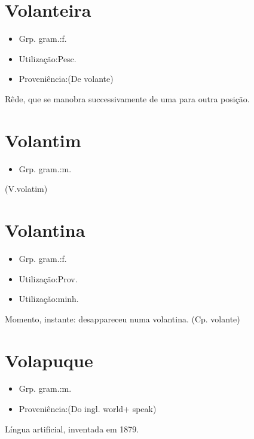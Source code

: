 \documentclass{article}
\begin{document}
\section{Volanteira}
\begin{itemize}
\item {Grp. gram.:f.}
\end{itemize}
\begin{itemize}
\item {Utilização:Pesc.}
\end{itemize}
\begin{itemize}
\item {Proveniência:(De \textunderscore volante\textunderscore )}
\end{itemize}
Rêde, que se manobra successivamente de uma para outra posição.
\section{Volantim}
\begin{itemize}
\item {Grp. gram.:m.}
\end{itemize}
(V.volatim)
\section{Volantina}
\begin{itemize}
\item {Grp. gram.:f.}
\end{itemize}
\begin{itemize}
\item {Utilização:Prov.}
\end{itemize}
\begin{itemize}
\item {Utilização:minh.}
\end{itemize}
Momento, instante: \textunderscore desappareceu numa volantina\textunderscore .
(Cp. \textunderscore volante\textunderscore )
\section{Volapuque}
\begin{itemize}
\item {Grp. gram.:m.}
\end{itemize}
\begin{itemize}
\item {Proveniência:(Do ingl. \textunderscore world\textunderscore  + \textunderscore speak\textunderscore )}
\end{itemize}
Língua artificial, inventada em 1879.
\end{document}
